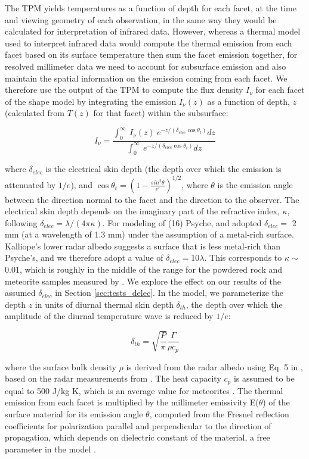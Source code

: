\documentclass[]{aastex631}
\begin{document}
The TPM yields temperatures as a function of depth for each facet, at the time and viewing geometry of each observation, in the same way they would be calculated for interpretation of infrared data. However, whereas a thermal model used to interpret infrared data would compute the thermal emission from each facet based on its surface temperature then sum the facet emission together, for resolved millimeter data we need to account for subsurface emission and also maintain the spatial information on the emission coming from each facet. We therefore use the output of the TPM to compute the flux density $I_\nu$ for each facet of the shape model by integrating the emission $I_\nu(z)$ as a function of depth, $z$ (calculated from $T(z)$ for that facet) within the subsurface:

\begin{equation}
I_\nu = \frac{\int_0^\infty~I_\nu(z)~e^{-z/(\delta_{elec}\cos{\theta_t})}dz}{\int_0^\infty~e^{-z/(\delta_{elec}\cos{\theta_t})}dz}
\end{equation}

\noindent
where $\delta_{elec}$ is the electrical skin depth (the depth over which the emission is attenuated by $1/e$), and $\cos{\theta_t} = (1-\frac{sin^2{\theta}}{\epsilon'})^{1/2}$, where $\theta$ is the emission angle between the direction normal to the facet and the direction to the observer. The electrical skin depth depends on the imaginary part of the refractive index, $\kappa$, following $\delta_{elec} =\lambda/(4\pi \kappa)$. For modeling of (16) Psyche, \cite{dekleer2021} and \cite{cambioni2022} adopted $\delta_{elec}=$ 2 mm (at a wavelength of 1.3 mm) under the assumption of a metal-rich surface. Kalliope's lower radar albedo suggests a surface that is less metal-rich than Psyche's, and we therefore adopt a value of $\delta_{elec}=$10$\lambda$. This corresponds to $\kappa \sim$0.01, which is roughly in the middle of the range for the powdered rock and meteorite samples measured by \cite{campbell1969}. We explore the effect on our results of the assumed $\delta_{elec}$ in Section \ref{sec:tests_delec}. In the model, we parameterize the depth $z$ in units of diurnal thermal skin depth $\delta_{th}$, the depth over which the amplitude of the diurnal temperature wave is reduced by $1/e$:

\begin{equation}
\delta_{th} = \sqrt{\frac{P}{\pi}} \frac{\Gamma}{\rho c_p}
\end{equation}

\noindent where the surface bulk density $\rho$ is derived from the radar albedo using Eq. 5 in \citet{shepard2015}, based on the radar measurements from \citet{2007IcarMagri}. The heat capacity $c_p$ is assumed to be equal to 500 J/kg K, which is an average value for meteorites \citep{2021JGREPiqueux}. The thermal emission from each facet is multiplied by the millimeter emissivity E($\theta$) of the surface material for its emission angle $\theta$, computed from the Fresnel reflection coefficients for polarization parallel and perpendicular to the direction of propagation, which depends on dielectric constant of the material, a free parameter in the model \citep{dekleer2021}. 
\end{document}
